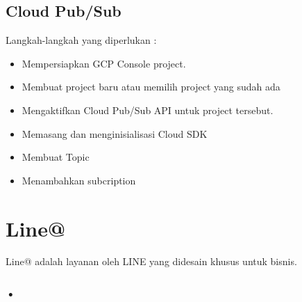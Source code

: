 \subsection{Cloud Pub/Sub}
Langkah-langkah yang diperlukan :\footnotemark
{}
\begin{itemize}
\item Mempersiapkan GCP Console project.
\item Membuat project baru atau memilih project yang sudah ada
\item Mengaktifkan Cloud Pub/Sub API untuk project tersebut.
\item Memasang dan menginisialisasi Cloud SDK
\item Membuat Topic
\item Menambahkan subcription
\end{itemize}
\footnotemark
{}

\section{Line@}
\label{sec:Line@}
Line@ adalah layanan oleh LINE yang didesain khusus untuk bisnis.
\subsubsection{•}